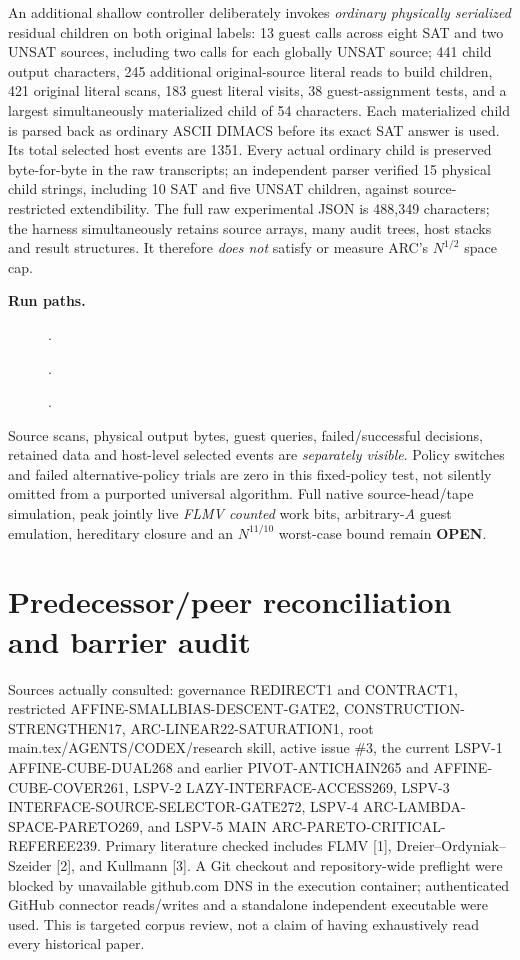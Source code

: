 \documentclass[11pt]{article}
\begin{document}
An additional shallow controller deliberately invokes \emph{ordinary physically serialized} residual children on both original labels: 13 guest calls across eight SAT and two UNSAT sources, including two calls for each globally UNSAT source; 441 child output characters, 245 additional original-source literal reads to build children, 421 original literal scans, 183 guest literal visits, 38 guest-assignment tests, and a largest simultaneously materialized child of 54 characters. Each materialized child is parsed back as ordinary ASCII DIMACS before its exact SAT answer is used. Its total selected host events are 1351. Every actual ordinary child is preserved byte-for-byte in the raw transcripts; an independent parser verified 15 physical child strings, including 10 SAT and five UNSAT children, against source-restricted extendibility. The full raw experimental JSON is 488,349 characters; the harness simultaneously retains source arrays, many audit trees, host stacks and result structures. It therefore \emph{does not} satisfy or measure ARC's $N^{1/2}$ space cap.

\noindent\textbf{Run paths.}
\begin{description}
\item[] .
\item[] .
\item[] .
\end{description}
Source scans, physical output bytes, guest queries, failed/successful decisions, retained data and host-level selected events are \emph{separately visible}. Policy switches and failed alternative-policy trials are zero in this fixed-policy test, not silently omitted from a purported universal algorithm. Full native source-head/tape simulation, peak jointly live \emph{FLMV counted} work bits, arbitrary-$A$ guest emulation, hereditary closure and an $N^{11/10}$ worst-case bound remain \textbf{OPEN}.

\section{Predecessor/peer reconciliation and barrier audit}
Sources actually consulted: governance REDIRECT1 and CONTRACT1, restricted AFFINE-SMALLBIAS-DESCENT-GATE2, CONSTRUCTION-STRENGTHEN17, ARC-LINEAR22-SATURATION1, root main.tex/AGENTS/CODEX/research skill, active issue \#3, the current LSPV-1 AFFINE-CUBE-DUAL268 and earlier PIVOT-ANTICHAIN265 and AFFINE-CUBE-COVER261, LSPV-2 LAZY-INTERFACE-ACCESS269, LSPV-3 INTERFACE-SOURCE-SELECTOR-GATE272, LSPV-4 ARC-LAMBDA-SPACE-PARETO269, and LSPV-5 MAIN ARC-PARETO-CRITICAL-REFEREE239. Primary literature checked includes FLMV [1], Dreier--Ordyniak--Szeider [2], and Kullmann [3]. A Git checkout and repository-wide preflight were blocked by unavailable github.com DNS in the execution container; authenticated GitHub connector reads/writes and a standalone independent executable were used. This is targeted corpus review, not a claim of having exhaustively read every historical paper.
\end{document}
